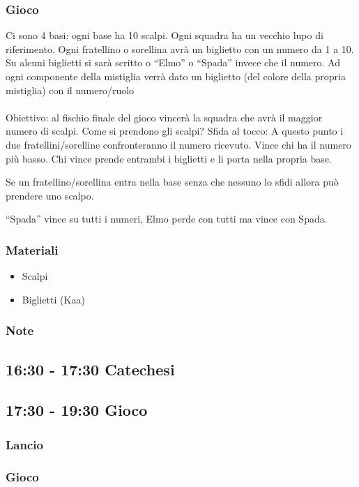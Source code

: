 \documentclass[../main.tex]{subfiles}
\begin{document}
        \subsubsection{Gioco}
        Ci sono 4 basi: ogni base ha 10 scalpi.
        Ogni squadra ha un vecchio lupo di riferimento. Ogni fratellino o sorellina avrà un biglietto con un numero da 1 a 10. Su alcuni biglietti si sarà scritto o “Elmo” o “Spada” invece che il numero.
        Ad ogni componente della mistiglia verrà dato un biglietto (del colore della propria mistiglia) con il numero/ruolo\\
        \\
        Obiettivo: al fischio finale del gioco vincerà la squadra che avrà il maggior numero di scalpi.
        Come si prendono gli scalpi? Sfida al tocco: A questo punto i due fratellini/sorelline confronteranno il numero ricevuto. Vince chi ha il numero più basso. Chi vince prende entrambi i biglietti e li porta nella propria base.

        Se un fratellino/sorellina entra nella base senza che nessuno lo sfidi allora può prendere uno scalpo.

        “Spada” vince su tutti i numeri, Elmo perde con tutti ma vince con Spada.

        \subsubsection{Materiali}
        \begin{itemize}
            \item Scalpi
            \item Biglietti (Kaa)
        \end{itemize}
       \subsubsection{Note}
    \subsection{16:30 - 17:30 Catechesi}   
    \subsection{17:30 - 19:30 Gioco}
        \subsubsection{Lancio}
        \subsubsection{Gioco}
\end{document}

